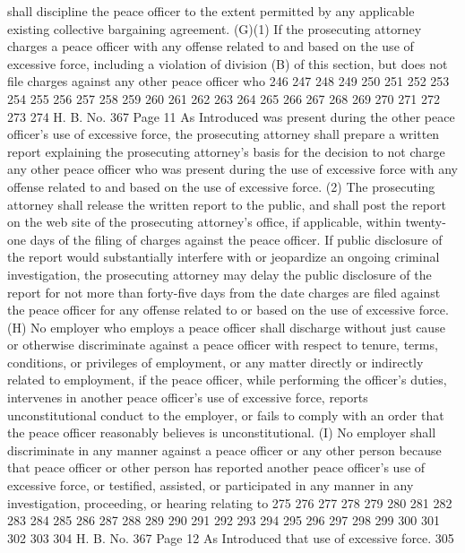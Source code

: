 shall discipline the peace officer to the extent permitted by
any applicable existing collective bargaining agreement.
(G)(1) If the prosecuting attorney charges a peace officer
with any offense related to and based on the use of excessive
force, including a violation of division (B) of this section,
but does not file charges against any other peace officer who
246
247
248
249
250
251
252
253
254
255
256
257
258
259
260
261
262
263
264
265
266
267
268
269
270
271
272
273
274
H. B. No. 367 Page 11
As Introduced
was present during the other peace officer's use of excessive
force, the prosecuting attorney shall prepare a written report
explaining the prosecuting attorney's basis for the decision to
not charge any other peace officer who was present during the
use of excessive force with any offense related to and based on
the use of excessive force.
(2) The prosecuting attorney shall release the written
report to the public, and shall post the report on the web site
of the prosecuting attorney's office, if applicable, within
twenty-one days of the filing of charges against the peace
officer. If public disclosure of the report would substantially
interfere with or jeopardize an ongoing criminal investigation,
the prosecuting attorney may delay the public disclosure of the
report for not more than forty-five days from the date charges
are filed against the peace officer for any offense related to
or based on the use of excessive force.
(H) No employer who employs a peace officer shall
discharge without just cause or otherwise discriminate against a
peace officer with respect to tenure, terms, conditions, or
privileges of employment, or any matter directly or indirectly
related to employment, if the peace officer, while performing
the officer's duties, intervenes in another peace officer's use
of excessive force, reports unconstitutional conduct to the
employer, or fails to comply with an order that the peace
officer reasonably believes is unconstitutional.
(I) No employer shall discriminate in any manner against a
peace officer or any other person because that peace officer or
other person has reported another peace officer's use of
excessive force, or testified, assisted, or participated in any
manner in any investigation, proceeding, or hearing relating to
275
276
277
278
279
280
281
282
283
284
285
286
287
288
289
290
291
292
293
294
295
296
297
298
299
300
301
302
303
304
H. B. No. 367 Page 12
As Introduced
that use of excessive force. 305